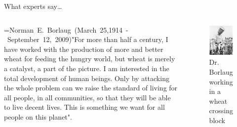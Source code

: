 \documentclass[11pt,ignorenonframetext,aspectratio=169]{beamer}
\newcommand{\bcolumns}{\begin{columns}[T, onlytextwidth]}
\newcommand{\ecolumns}{\end{columns}}
\begin{document}
\begin{frame}{What experts say\ldots{}}
\protect\hypertarget{what-experts-say}{}
\bcolumns
{}

=\hbox{Norman E. Borlaug (March 25,1914 - September 12, 2009)}"For more than half a century, I have worked with the production of more and better wheat for feeding the hungry world, but wheat is merely a catalyst, a part of the picture. I am interested in the total development of human beings. Only by attacking the whole problem can we raise the standard of living for all people, in all communities, so that they will be able to live decent lives. This is something we want for all people on this planet".


\begin{figure}
\includegraphics[width=0.95\linewidth]{./images/borlaug_wheat_crossing_block} \caption{Dr. Borlaug working in a wheat crossing block}\label{fig:borlaug}
\end{figure}

\ecolumns
\end{frame}
\end{document}

